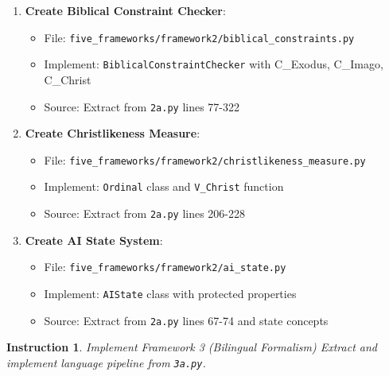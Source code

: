 \documentclass[12pt]{article}
\newtheorem{instruction}{Instruction}
\begin{document}
\begin{enumerate}
    \item \textbf{Create Biblical Constraint Checker}:
    \begin{itemize}
        \item File: \texttt{five\_frameworks/framework2/biblical\_constraints.py}
        \item Implement: \texttt{BiblicalConstraintChecker} with C\_Exodus, C\_Imago, C\_Christ
        \item Source: Extract from \texttt{2a.py} lines 77-322
    \end{itemize}

    \item \textbf{Create Christlikeness Measure}:
    \begin{itemize}
        \item File: \texttt{five\_frameworks/framework2/christlikeness\_measure.py}
        \item Implement: \texttt{Ordinal} class and \texttt{V\_Christ} function
        \item Source: Extract from \texttt{2a.py} lines 206-228
    \end{itemize}

    \item \textbf{Create AI State System}:
    \begin{itemize}
        \item File: \texttt{five\_frameworks/framework2/ai\_state.py}
        \item Implement: \texttt{AIState} class with protected properties
        \item Source: Extract from \texttt{2a.py} lines 67-74 and state concepts
    \end{itemize}
\end{enumerate}

\begin{instruction}{Implement Framework 3 (Bilingual Formalism)}
Extract and implement language pipeline from \texttt{3a.py}.
\end{instruction}
\end{document}
